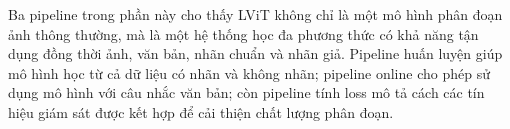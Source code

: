 Ba pipeline trong phần này cho thấy LViT không chỉ là một mô hình phân đoạn ảnh thông thường, mà là một hệ thống học đa phương thức có khả năng tận dụng đồng thời ảnh, văn bản, nhãn chuẩn và nhãn giả. Pipeline huấn luyện giúp mô hình học từ cả dữ liệu có nhãn và không nhãn; pipeline online cho phép sử dụng mô hình với câu nhắc văn bản; còn pipeline tính loss mô tả cách các tín hiệu giám sát được kết hợp để cải thiện chất lượng phân đoạn.